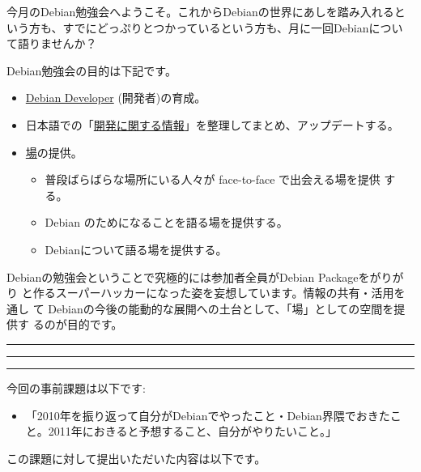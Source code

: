 \documentclass[mingoth,a4paper]{jsarticle}
\begin{document}
\begin{multicols}{2}
 

 今月のDebian勉強会へようこそ。これからDebianの世界にあしを踏み入れると
 いう方も、すでにどっぷりとつかっているという方も、月に一回Debianについ
 て語りませんか？

 Debian勉強会の目的は下記です。

 \begin{itemize}
 \item \underline{Debian Developer} (開発者)の育成。
 \item 日本語での「\underline{開発に関する情報}」を整理してまとめ、アップデートする。
 \item \underline{場}の提供。
 \begin{itemize}
  \item 普段ばらばらな場所にいる人々が face-to-face で出会える場を提供
	する。
  \item Debian のためになることを語る場を提供する。
  \item Debianについて語る場を提供する。
 \end{itemize}
 \end{itemize}		

 Debianの勉強会ということで究極的には参加者全員がDebian Packageをがりがり
 と作るスーパーハッカーになった姿を妄想しています。情報の共有・活用を通し
 て Debianの今後の能動的な展開への土台として、「場」としての空間を提供す
 るのが目的です。

\end{multicols}

\newpage

\begin{minipage}[b]{0.2\hsize}
 \colorbox{titleback}{}
\end{minipage}
\begin{minipage}[b]{0.8\hsize}
\hrule
\vspace{2mm}
\hrule
\begin{multicols}{2}
\tableofcontents
\end{multicols}
\vspace{2mm}
\hrule
\end{minipage}


今回の事前課題は以下です:
\begin{itemize}
 \item 「2010年を振り返って自分がDebianでやったこと・Debian界隈でおきたこと。2011年におきると予想すること、自分がやりたいこと。」
\end{itemize}
この課題に対して提出いただいた内容は以下です。
\begin{multicols}{2}
{\small
 
}
\end{multicols}
\end{document}
